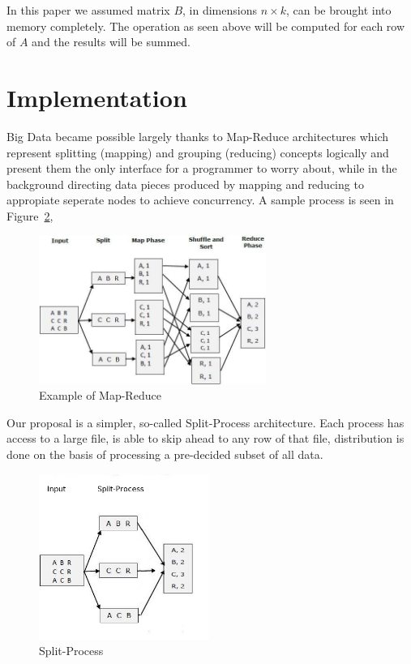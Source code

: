 \documentclass{article}
\begin{document}
In this paper we assumed matrix $B$, in dimensions $n \times k$, can be brought
into memory completely. The operation as seen above will be computed for each
row of $A$ and the results will be summed.

\section{Implementation}

Big Data became possible largely thanks to Map-Reduce architectures which
represent splitting (mapping) and grouping (reducing) concepts logically and
present them the only interface for a programmer to worry about, while in the
background directing data pieces produced by mapping and reducing to appropiate
seperate nodes to achieve concurrency. A sample process is seen in
Figure~\ref{fig:mapreduce1},

\begin{figure}[h]
  \centering
  \includegraphics[width=20em]{mapreduce1.jpg}
  \caption{Example of Map-Reduce}
  \label{fig:mapreduce1}
\end{figure}

Our proposal is a simpler, so-called Split-Process architecture. Each process
has access to a large file, is able to skip ahead to any row of that file,
distribution is done on the basis of processing a pre-decided subset of all
data. 

\begin{figure}[h]
  \centering
  \includegraphics[width=15em]{splitprocess.jpg}
  \caption{Split-Process}
  \label{fig:mapreduce1}
\end{figure}
\end{document}
